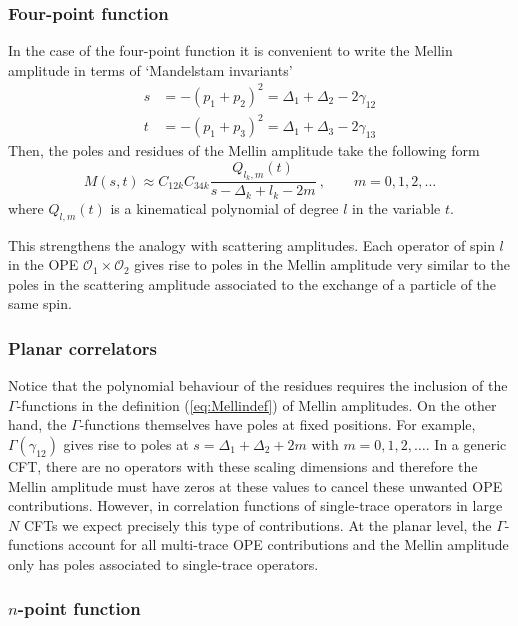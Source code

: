 \documentclass{ws-rv9x6}
\newcommand\be{\begin{equation}}
\newcommand\ee{\end{equation}}
\begin{document}
\subsubsection{Four-point function \label{sec:MellinOPE4pt}}

In the case of the four-point function it is convenient to write the Mellin amplitude in terms of `Mandelstam invariants'
\begin{align}
s&=-(p_1+p_2)^2=\Delta_1+\Delta_2-2\gamma_{12}\\
t&=-(p_1+p_3)^2=\Delta_1+\Delta_3-2\gamma_{13}
\end{align}
Then, the poles and residues of the Mellin amplitude take the following form \cite{Mack:2009mi}
\be
M(s,t) \approx C_{12k} C_{34k}  \frac{
Q_{l_k,m}(t)}{s-\Delta_k+l_k-2m}\ ,\qquad m=0,1,2,\dots
\label{eq:polesMellin4pt}
\ee
where $Q_{l,m}(t)$ is a kinematical polynomial of degree $l$ in the variable $t$.

This strengthens  the analogy with scattering amplitudes. Each operator of spin $l$ in the OPE $\mathcal{O}_1\times
\mathcal{O}_2$ gives rise to poles in the Mellin amplitude very similar to the poles in the scattering amplitude associated to the exchange of a 
particle of the same spin.



\subsubsection{Planar correlators}

Notice that the polynomial behaviour of the residues requires the inclusion of the $\Gamma$-functions in the definition (\ref{eq:Mellindef}) of Mellin amplitudes.
On the other hand, the $\Gamma$-functions themselves have poles at fixed positions. For example, $\Gamma(\gamma_{12})$ gives rise to poles at $s=\Delta_1+\Delta_2+2m$ with $m=0,1,2,\dots$.
In a generic CFT, there are no operators with these scaling dimensions and therefore the Mellin amplitude must have zeros at these values to cancel these unwanted OPE contributions.
However, in correlation functions of single-trace operators in large $N$ CFTs we expect precisely this type of contributions. At the planar level, the $\Gamma$-functions account for all multi-trace OPE contributions and the Mellin amplitude only has poles associated to  single-trace  operators.


\subsubsection{$n$-point function}
\end{document}
